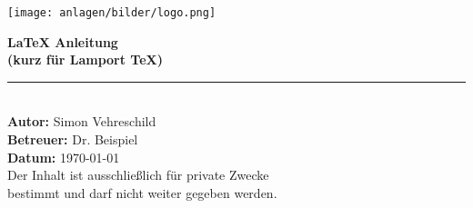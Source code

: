 \begin{titlepage}  %
    \begin{center}

        \vspace*{0.5cm}  %

        \texttt{[image: anlagen/bilder/logo.png]}
        \vspace{1cm}  %

        {\Huge \textbf{\LaTeX{} Anleitung}} \\[0.5cm]
        {\Large \textbf{(kurz für Lamport TeX)}} \\[1.5cm]

        \rule{12cm}{0.5pt} \\[1.5cm]  %

        \textbf{\Large Autor:} \Large Simon Vehreschild \\[0.5cm]
        \textbf{\Large Betreuer:} \Large Dr. Beispiel \\[0.5cm]
        \textbf{\Large Datum:} \Large \today \\[3cm]

        {Der Inhalt ist ausschließlich für private Zwecke} \\
        {bestimmt und darf nicht weiter gegeben werden.} \\

        \vfill  %
    \end{center}
\end{titlepage}